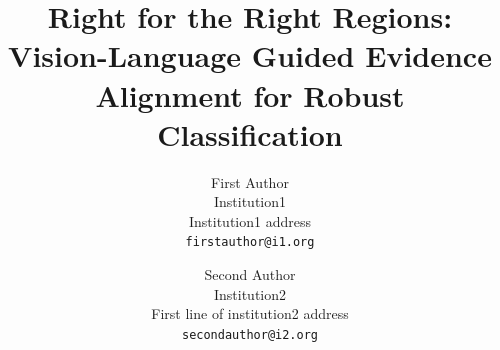 \documentclass[10pt,twocolumn,letterpaper]{article}
\title{Right for the Right Regions: Vision-Language Guided Evidence Alignment for Robust Classification}
\author{First Author\\
Institution1\\
Institution1 address\\
{\tt\small firstauthor@i1.org}
\and
Second Author\\
Institution2\\
First line of institution2 address\\
{\tt\small secondauthor@i2.org}
}
\begin{document}
\maketitle
    



{
    \small
    
    
}




\end{document}
